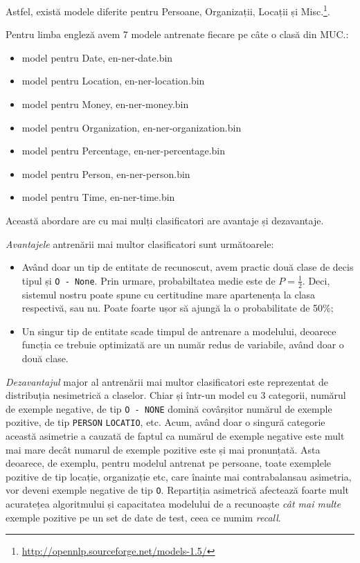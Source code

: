 Astfel, există modele diferite pentru Persoane, Organizații, Locații și Misc.\footnote{\url{http://opennlp.sourceforge.net/models-1.5/}}.

Pentru limba engleză avem 7 modele antrenate fiecare pe câte o clasă din MUC.:

\begin{itemize}
\item model pentru Date, en-ner-date.bin
\item model pentru Location, en-ner-location.bin
\item model pentru Money,	en-ner-money.bin
\item model pentru Organization,	en-ner-organization.bin
\item model pentru Percentage,	en-ner-percentage.bin
\item model pentru Person,	en-ner-person.bin
\item model pentru Time, en-ner-time.bin
\end{itemize}

Această abordare are cu mai mulți clasificatori are avantaje și dezavantaje.

\textit{Avantajele} antrenării mai multor clasificatori sunt următoarele:

\begin{itemize}
	\item Având doar un tip de entitate de recunoscut, avem practic două clase de decis tipul și \texttt{O - None}. Prin urmare, probabiltatea medie este de $P = \frac{1}{2} $. Deci, sistemul nostru poate spune cu certitudine mare apartenența la clasa respectivă, sau nu. Poate foarte ușor să ajungă la o probabilitate de 50\%;
	\item Un singur tip de entitate scade timpul de antrenare a modelului, deoarece funcția ce trebuie optimizată are un număr redus de variabile, având doar o două clase.
\end{itemize}

\textit{Dezavantajul} major al antrenării mai multor clasificatori este reprezentat de distribuția nesimetrică a claselor. Chiar și într-un model cu 3 categorii, numărul de exemple negative, de tip \texttt{O - NONE} domină covârșitor numărul de exemple pozitive, de tip \texttt{PERSON} \texttt{LOCATIO}, etc. Acum, având doar o singură categorie această asimetrie a cauzată de faptul ca numărul de exemple negative este mult mai mare decât numarul de exemple pozitive este și mai pronunțată. Asta deoarece, de exemplu, pentru modelul antrenat pe persoane, toate exemplele pozitive de tip locație, organizație etc, care înainte mai contrabalansau asimetria, vor deveni exemple negative de tip \texttt{O}. Repartiția asimetrică afectează foarte mult acuratețea algoritmului și capacitatea modelului de a recunoaște \textit{cât mai multe} exemple pozitive pe un set de date de test, ceea ce numim \textit{recall}.

